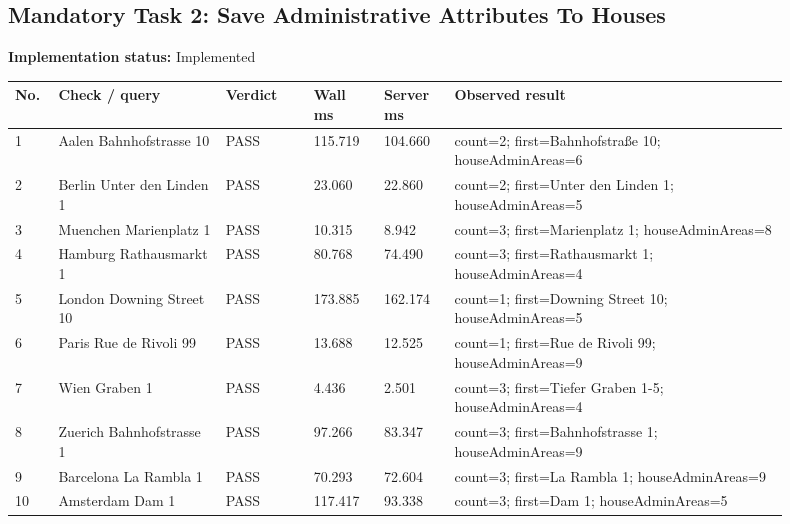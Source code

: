 \documentclass[10pt,a4paper]{article}
\begin{document}
\subsection{Mandatory Task 2: Save Administrative Attributes To Houses}
\textbf{Implementation status:} Implemented\\
\scriptsize
\begin{longtable}{|P{0.045\linewidth}|P{0.19\linewidth}|P{0.105\linewidth}|P{0.085\linewidth}|P{0.085\linewidth}|P{0.385\linewidth}|}
\hline
\textbf{No.} & \textbf{Check / query} & \textbf{Verdict} & \textbf{Wall ms} & \textbf{Server ms} & \textbf{Observed result}\\ \hline
{} 1 & Aalen Bahnhofstrasse 10 & PASS & 115.719 & 104.660 & count=2; first=Bahnhofstraße 10; houseAdminAreas=6\\ \hline
{} 2 & Berlin Unter den Linden 1 & PASS & 23.060 & 22.860 & count=2; first=Unter den Linden 1; houseAdminAreas=5\\ \hline
{} 3 & Muenchen Marienplatz 1 & PASS & 10.315 & 8.942 & count=3; first=Marienplatz 1; houseAdminAreas=8\\ \hline
{} 4 & Hamburg Rathausmarkt 1 & PASS & 80.768 & 74.490 & count=3; first=Rathausmarkt 1; houseAdminAreas=4\\ \hline
{} 5 & London Downing Street 10 & PASS & 173.885 & 162.174 & count=1; first=Downing Street 10; houseAdminAreas=5\\ \hline
{} 6 & Paris Rue de Rivoli 99 & PASS & 13.688 & 12.525 & count=1; first=Rue de Rivoli 99; houseAdminAreas=9\\ \hline
{} 7 & Wien Graben 1 & PASS & 4.436 & 2.501 & count=3; first=Tiefer Graben 1-5; houseAdminAreas=4\\ \hline
{} 8 & Zuerich Bahnhofstrasse 1 & PASS & 97.266 & 83.347 & count=3; first=Bahnhofstrasse 1; houseAdminAreas=9\\ \hline
{} 9 & Barcelona La Rambla 1 & PASS & 70.293 & 72.604 & count=3; first=La Rambla 1; houseAdminAreas=9\\ \hline
{} 10 & Amsterdam Dam 1 & PASS & 117.417 & 93.338 & count=3; first=Dam 1; houseAdminAreas=5\\ \hline
\end{longtable}
\normalsize
\end{document}
